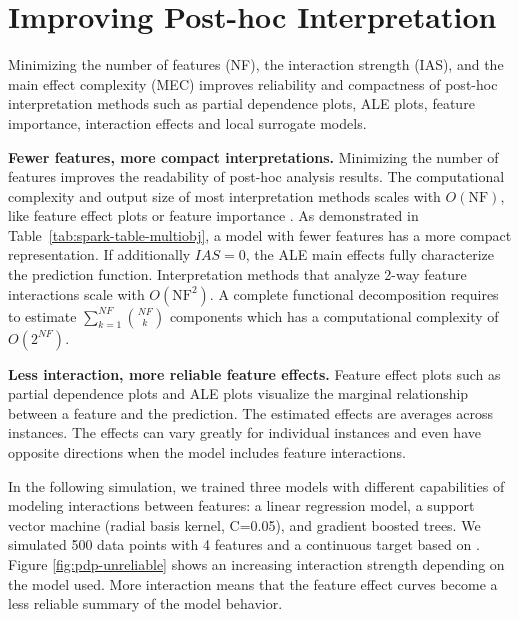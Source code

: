 \documentclass[runningheads]{llncs}\usepackage[]{graphicx}\usepackage[]{color}
\begin{document}





\section{Improving Post-hoc Interpretation}
\label{sec:post-hoc}

Minimizing the number of features (NF), the interaction strength (IAS), and the main effect complexity (MEC) improves reliability and compactness of post-hoc interpretation methods such as partial dependence plots, ALE plots, feature importance, interaction effects and local surrogate models.

\textbf{Fewer features, more compact interpretations.}
Minimizing the number of features improves the readability of post-hoc analysis results.
The computational complexity and output size of most interpretation methods scales with $O(\text{NF})$, like feature effect plots \citep{apley2016visualizing,friedman2001greedy} or feature importance \citep{fisher2018all,casalicchio2018visualizing}.
As demonstrated in Table~\ref{tab:spark-table-multiobj}, a model with fewer features has a more compact representation.
If additionally $IAS=0$, the ALE main effects fully characterize the prediction function.
Interpretation methods that analyze 2-way feature interactions scale with $O(\text{NF}^2)$.
A complete functional decomposition requires to estimate $\sum_{k=1}^{NF} {NF\choose k}$ components which has a computational complexity of $O(2^{NF})$.

\textbf{Less interaction, more reliable feature effects.}
Feature effect plots such as partial dependence plots and ALE plots visualize the marginal relationship between a feature and the prediction.
The estimated effects are averages across instances.
The effects can vary greatly for individual instances and even have opposite directions when the model includes feature interactions.

In the following simulation, we trained three models with different capabilities of modeling interactions between features: a linear regression model, a support vector machine (radial basis kernel, C=0.05), and gradient boosted trees.
We simulated 500 data points with 4 features and a continuous target based on \citep{friedman1991multivariate}.
Figure \ref{fig:pdp-unreliable} shows an increasing interaction strength depending on the model used.
More interaction means that the feature effect curves become a less reliable summary of the model behavior.
\end{document}
